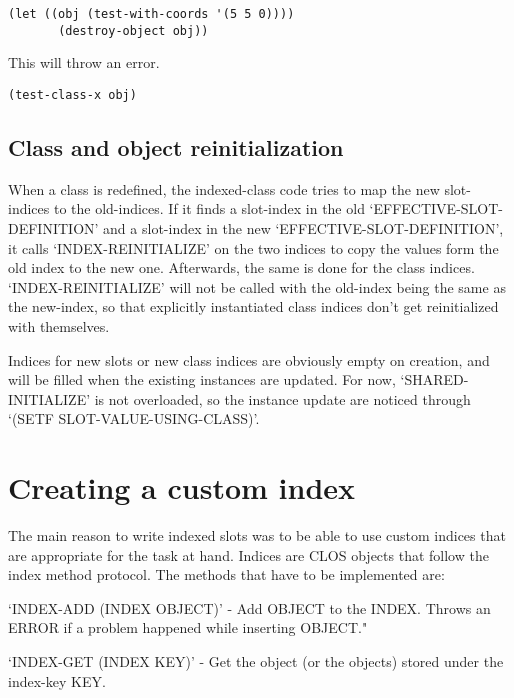\begin{Verbatim}[fontsize=\small,frame=leftline,framerule=0.9mm,rulecolor=\color{gray},framesep=5.1mm,xleftmargin=5mm,fontfamily=cmtt]
(let ((obj (test-with-coords '(5 5 0))))
       (destroy-object obj))
\end{Verbatim}
This will throw an error.


\begin{Verbatim}[fontsize=\small,frame=leftline,framerule=0.9mm,rulecolor=\color{gray},framesep=5.1mm,xleftmargin=5mm,fontfamily=cmtt]
(test-class-x obj)
\end{Verbatim}


\subsection{ Class and object reinitialization}

When a class is redefined, the indexed-class code tries to map
the new slot-indices to the old-indices. If it finds a slot-index
in the old `EFFECTIVE-SLOT-DEFINITION' and a slot-index in the new
`EFFECTIVE-SLOT-DEFINITION', it calls `INDEX-REINITIALIZE' on the
two indices to copy the values form the old index to the new
one. Afterwards, the same is done for the class
indices. `INDEX-REINITIALIZE' will not be called with the
old-index being the same as the new-index, so that explicitly
instantiated class indices don't get reinitialized with
themselves.

Indices for new slots or new class indices are obviously empty on
creation, and will be filled when the existing instances are
updated. For now, `SHARED-INITIALIZE' is not overloaded, so the
instance update are noticed through `(SETF SLOT-VALUE-USING-CLASS)'.


\section{ Creating a custom index}

The main reason to write indexed slots was to be able to use
custom indices that are appropriate for the task at hand. Indices
are CLOS objects that follow the index method protocol. The
methods that have to be implemented are:

`INDEX-ADD (INDEX OBJECT)' - Add OBJECT to the INDEX. Throws an
ERROR if a problem happened while inserting OBJECT."

`INDEX-GET (INDEX KEY)' - Get the object (or the objects) stored
under the index-key KEY.

